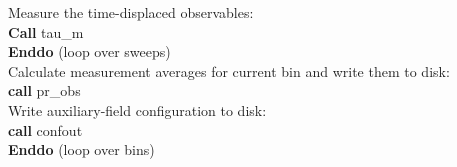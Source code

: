 \begin{mdframed}[frametitle={Basic structure of the auxiliary-field QMC implementation (\path{Prog/main.F90}):}]
{\hspace*{2em} Measure the time-displaced observables: \\
\hspace*{2em} \textbf{Call} tau\_m\\
\hspace*{1em} \textbf{Enddo} (loop over sweeps)\\
    
\hspace*{1em} Calculate measurement averages for current bin and write them to disk:\\
\hspace*{1em} \textbf{call} pr\_obs\\
\hspace*{1em} Write auxiliary-field configuration to disk: \\
\hspace*{1em} \textbf{call} confout\\
\textbf{Enddo} (loop over bins)\\
% 
}
\end{mdframed}
% 
% 
% 
% 
% 
% 
% 
%    
%       
%          
%                         
